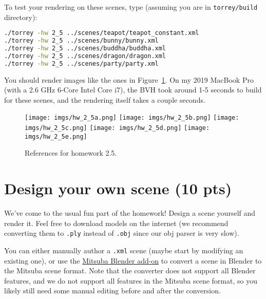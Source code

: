 To test your rendering on these scenes, type (assuming you are in \lstinline{torrey/build} directory):
\begin{lstlisting}[language=bash]
./torrey -hw 2_5 ../scenes/teapot/teapot_constant.xml
./torrey -hw 2_5 ../scenes/bunny/bunny.xml
./torrey -hw 2_5 ../scenes/buddha/buddha.xml
./torrey -hw 2_5 ../scenes/dragon/dragon.xml
./torrey -hw 2_5 ../scenes/party/party.xml
\end{lstlisting}

You should render images like the ones in Figure~\ref{fig:hw_2_5}. On my 2019 MacBook Pro (with a 2.6 GHz 6-Core Intel Core i7), the BVH took around 1-5 seconds to build for these scenes, and the rendering itself takes a couple seconds.
\begin{figure}[ht]
    \centering
    \texttt{[image: imgs/hw\_2\_5a.png]}
    \texttt{[image: imgs/hw\_2\_5b.png]}
    \texttt{[image: imgs/hw\_2\_5c.png]}
    \texttt{[image: imgs/hw\_2\_5d.png]}
    \texttt{[image: imgs/hw\_2\_5e.png]}
    \caption{References for homework 2.5.}
    \label{fig:hw_2_5}
\end{figure}

\section{Design your own scene (10 pts)}
We've come to the usual fun part of the homework! Design a scene yourself and render it. Feel free to download models on the internet (we recommend converting them to \lstinline{.ply} instead of \lstinline{.obj} since our obj parser is very slow). 

You can either manually author a \lstinline{.xml} scene (maybe start by modifying an existing one), or use the \href{https://github.com/mitsuba-renderer/mitsuba-blender}{Mitsuba Blender add-on} to convert a scene in Blender to the Mitsuba scene format. Note that the converter does not support all Blender features, and we do not support all features in the Mitsuba scene format, so you likely still need some manual editing before and after the conversion.

